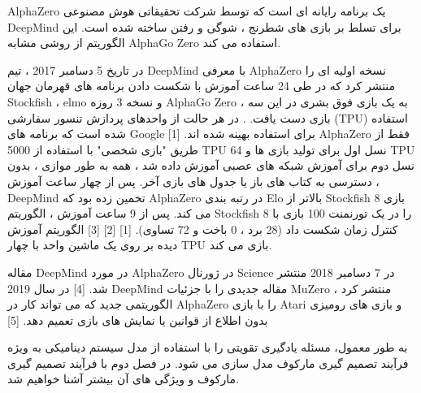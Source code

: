    
   
   AlphaZero یک برنامه رایانه ای است که توسط شرکت تحقیقاتی هوش مصنوعی DeepMind برای تسلط بر بازی های شطرنج ، شوگی و رفتن ساخته شده است. این الگوریتم از روشی مشابه AlphaGo Zero استفاده می کند.
   
   در تاریخ 5 دسامبر 2017 ، تیم DeepMind با معرفی AlphaZero نسخه اولیه ای را منتشر کرد که در طی 24 ساعت آموزش با شکست دادن برنامه های قهرمان جهان Stockfish ، elmo و نسخه 3 روزه AlphaGo Zero ، به یک بازی فوق بشری در این سه بازی دست یافت. . در هر حالت از واحدهای پردازش تنسور سفارشی (TPU) استفاده شده است که برنامه های Google برای استفاده بهینه شده اند. [1] AlphaZero فقط از طریق "بازی شخصی" با استفاده از 5000 TPU نسل اول برای تولید بازی ها و 64 TPU نسل دوم برای آموزش شبکه های عصبی آموزش داده شد ، همه به طور موازی ، بدون دسترسی به کتاب های باز یا جدول های بازی آخر. پس از چهار ساعت آموزش ، DeepMind تخمین زده بود که AlphaZero در رتبه بندی Elo بالاتر از Stockfish 8 بازی می کند. پس از 9 ساعت آموزش ، الگوریتم Stockfish 8 را در یک تورنمنت 100 بازی با کنترل زمان شکست داد (28 برد ، 0 باخت و 72 تساوی). [1] [2] [3] الگوریتم آموزش دیده بر روی یک ماشین واحد با چهار TPU بازی می کند.
   
   مقاله DeepMind در مورد AlphaZero در ژورنال Science در 7 دسامبر 2018 منتشر شد. [4] در سال 2019 DeepMind مقاله جدیدی را با جزئیات MuZero منتشر کرد ، الگوریتمی جدید که می تواند کار در AlphaZero را با بازی Atari و بازی های رومیزی بدون اطلاع از قوانین یا نمایش های بازی تعمیم دهد. [5]
%
  
  





به طور معمول، مسئله یادگیری تقویتی را با استفاده از مدل سیستم دینامیکی به ویژه فرآیند تصمیم گیری مارکوف مدل سازی می شود. در فصل دوم با فرآیند تصمیم گیری مارکوف و ویژگی های آن بیشتر آشنا خواهیم شد.

